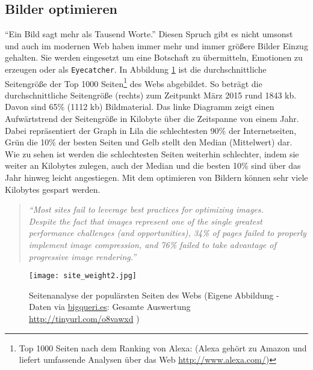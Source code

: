 	\subsection{Bilder optimieren} %
	\label{sub:bilder_optimieren}
		"`Ein Bild sagt mehr als Tausend Worte."' Diesen Spruch gibt es nicht umsonst und auch im modernen Web haben immer mehr und immer größere Bilder Einzug gehalten. Sie werden eingesetzt um eine Botschaft zu übermitteln, Emotionen zu erzeugen oder als \texttt{Eyecatcher}. In Abbildung \ref{fig:site_weight} ist die durchschnittliche Seitengröße der Top 1000 Seiten\footnote{Top 1000 Seiten nach dem Ranking von Alexa: (Alexa gehört zu Amazon und liefert umfassende Analysen über das Web \url{http://www.alexa.com/}) } des Webs abgebildet. So beträgt die durchschnittliche Seitengröße (rechts) zum Zeitpunkt März 2015 rund 1843 kb. Davon sind 65\% (1112 kb) Bildmaterial. Das linke Diagramm zeigt einen Aufwärtstrend der Seitengröße in Kilobyte über die Zeitspanne von einem Jahr. Dabei repräsentiert der Graph in Lila die schlechtesten 90\% der Internetseiten, Grün die 10\% der besten Seiten und Gelb stellt den Median (Mittelwert) dar. Wie zu sehen ist werden die schlechtesten Seiten weiterhin schlechter, indem sie weiter an Kilobytes zulegen, auch der Median und die besten 10\% sind über das Jahr hinweg leicht angestiegen. Mit dem optimieren von Bildern können sehr viele Kilobytes gespart werden.

		\begin{quote}
			\textit{"`Most sites fail to leverage best practices for optimizing images.\\
			Despite the fact that images represent one of the single greatest performance challenges (and opportunities), 34\% of pages failed to properly implement image compression, and 76\% failed to take advantage of progressive image rendering."'} \autocite[p. 4]{radware14}
		\end{quote}

		\begin{figure}[htbp]
			\begin{center}
				\texttt{[image: site\_weight2.jpg]}
				\caption{Seitenanalyse der populärsten Seiten des Webs (Eigene Abbildung - Daten via \url{bigqueri.es}: Gesamte Auswertung \url{http://tinyurl.com/o8vawxd} )}
				\label{fig:site_weight}
			\end{center}
		\end{figure}

